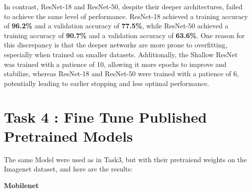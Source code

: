 \documentclass[12pt]{article}
\begin{document}
In contrast, ResNet-18 and ResNet-50, despite their deeper architectures, failed to achieve the same level of performance. ResNet-18 achieved a training accuracy of \textbf{96.2\%} and a validation accuracy of \textbf{77.5\%}, while ResNet-50 achieved a training accuracy of \textbf{90.7\%} and a validation accuracy of \textbf{63.6\%}. One reason for this discrepancy is that the deeper networks are more prone to overfitting, especially when trained on smaller datasets. Additionally, the Shallow ResNet was trained with a patience of 10, allowing it more epochs to improve and stabilize, whereas ResNet-18 and ResNet-50 were trained with a patience of 6, potentially leading to earlier stopping and less optimal performance.


\section*{Task 4 : Fine Tune Published Pretrained Models}
The same Model were used as in Task3, but with their pretraiend weights on the Imagenet dataset, and here are the results:

\textbf{Mobilenet}
\end{document}
